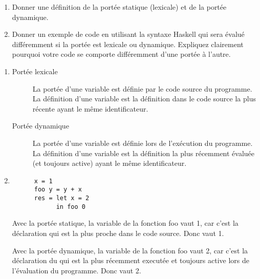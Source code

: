 \begin{Exercise}
  \label{ex:portee2}
\begin{enumerate}
\item Donner une définition de la portée statique (lexicale) et de la portée
dynamique.

\item 
Donner un exemple de code en utilisant la syntaxe Haskell qui sera
évalué différemment si la portée est lexicale ou dynamique. Expliquez
clairement pourquoi votre code se comporte différemment d'une portée à
l'autre.
\end{enumerate}
\end{Exercise}

\begin{Answer}[ref={ex:portee2}]
  \begin{enumerate}

  \item
    \begin{description}
    \item[Portée lexicale] La portée d'une variable est définie par le
      code source du programme.  La définition d'une variable est la
      définition dans le code source la plus récente ayant le même
      identificateur.
    \item [Portée dynamique] La portée d'une variable est définie lors
      de l'exécution du programme. La définition d'une variable est la
      définition la plus récemment évaluée (et toujours active) ayant
      le même identificateur.
    \end{description}

  \item
    \begin{verbatim}
      x = 1
      foo y = y + x
      res = let x = 2
            in foo 0
    \end{verbatim}
    Avec la portée statique, la variable  de la fonction
    foo vaut 1, car c'est la déclaration  qui est la
    plus proche dans le code source. Donc  vaut 1.

    Avec la portée dynamique, la variable  de la
    fonction foo vaut 2, car c'est la déclaration 
    du  qui est la plus récemment executée et toujours
    active lors de l'évaluation du programme. Donc 
    vaut 2.

  \end{enumerate}
\end{Answer}